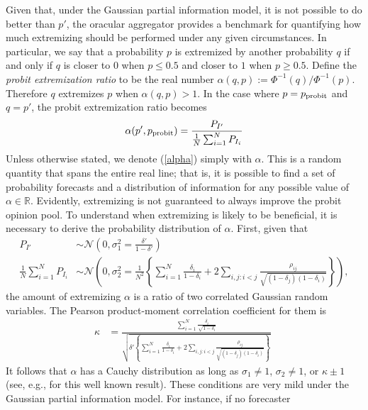\documentclass[11pt]{article}
\theoremstyle{definition}
\theoremstyle{definition}
\def\probit{p_{\rm probit}}
\begin{document}
Given that, under the Gaussian partial information model, it is not possible to do better than $p'$, the oracular aggregator provides a benchmark for quantifying how much extremizing should be performed under any given circumstances. In particular, we say that a probability $p$ is extremized by another probability $q$ 
if and only if $q$ is closer to $0$ when $p \leq 0.5$ and closer 
to $1$ when $p \geq 0.5$.  Define the {\em probit extremization ratio}
to be the real number $\alpha(q,p) := \Phi^{-1}(q) / \Phi^{-1} (p)$. Therefore
$q$ extremizes $p$ when $\alpha(q,p) > 1$.  In the case where $p = \probit$ and $q = p'$,
the probit extremization ratio becomes
\begin{align}
\alpha(p', \probit)  = \frac{P_{I'}}{\frac{1}{N}\sum_{i=1}^N P_{I_i}}\label{alpha}
\end{align}
Unless otherwise stated, we denote (\ref{alpha}) simply with $\alpha$. This is a random quantity that spans the entire real line; that is, 
it is possible to find a set of probability forecasts and a distribution 
of information for any possible value of $\alpha \in \mathbb{R}$. 
Evidently, extremizing is not guaranteed to always improve the 
probit opinion pool.  
To understand when extremizing is likely to be beneficial, 
it is necessary to derive the probability distribution of $\alpha$. 
First, given that 
\begin{align*}
P_{I'} &\sim \mathcal{N}\left(0, \sigma^2_{1} = 
  \frac{\delta'}{1-\delta'} \right)\\ \frac{1}{N}\sum_{i=1}^N P_{I_i} 
&\sim \mathcal{N}\left(0, \sigma^2_{2} =\frac{1}{N^2} 
  \left\{ \sum_{i=1}^N \frac{\delta_i}{1-\delta_i} 
  + 2 \sum_{i,j: i<j} \frac{\rho_{ij}}{\sqrt{(1-\delta_j)(1-\delta_i)}}
  \right\} \right),
\end{align*}
the amount of extremizing $\alpha$ is a ratio of two correlated 
Gaussian random variables.  The Pearson product-moment correlation 
coefficient for them is
\begin{align*}
\kappa  &= 
  \frac{ \sum_{i=1}^N \frac{\delta_i}{\sqrt{1-\delta_i}}}
  {\sqrt{\delta'  \left\{ \sum_{i=1}^N \frac{\delta_i}{1-\delta_i} + 2 
  \sum_{i,j: i<j} \frac{\rho_{ij}}{\sqrt{(1-\delta_j)(1-\delta_i)}}\right\}}}
  \; 
\end{align*}
It follows that $\alpha$ has a Cauchy distribution as long as 
$\sigma_1 \neq 1$, $\sigma_2 \neq 1$, or $\kappa \pm 1$ 
(see, e.g., \citealt{cedilnik2004distribution} for this 
well known result).  These conditions are very mild under 
the Gaussian partial information model.  For instance, if no forecaster 
\end{document}
